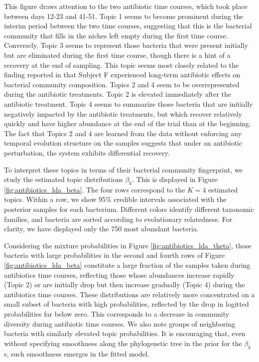 \documentclass{article}
\begin{document}
This figure draws attention to the two antibiotic time courses, which took place
between days 12-23 and 41-51. Topic 1 seems to become prominent during the
interim period between the two time courses, suggesting that this is the
bacterial community that fills in the niches left empty during the first time
course. Conversely, Topic 3 seems to represent those bacteria that were present
initially but are eliminated during the first time course, though there is a
hint of a recovery at the end of sampling. This topic seems most closely related
to the finding reported in \cite{dethlefsen2011incomplete} that Subject F
experienced long-term antibiotic effects on bacterial community composition.
Topics 2 and 4 seem to be overrepresented during the antibiotic treatments.
Topic 2 is elevated immediately after the antibiotic treatment. Topic 4 seems to
summarize those bacteria that are initially negatively impacted by the
antibiotic treatments, but which recover relatively quickly and have higher
abundance at the end of the trial than at the beginning. The fact that Topics 2
and 4 are learned from the data without enforcing any temporal evolution
structure on the samples suggests that under an antibiotic perturbation, the
system exhibits differential recovery.

To interpret these topics in terms of their bacterial community fingerprint, we
study the estimated topic distributions $\beta_{k}$. This is displayed in Figure
\ref{fig:antibiotics_lda_beta}. The four rows correspond to the $K = 4$
estimated topics. Within a row, we show 95\% credible intervals associated with
the posterior samples for each bacterium. Different colors identify different
taxonomic families, and bacteria are sorted according to evolutionary
relatedness. For clarity, we have displayed only the 750 most abundant bacteria.

Considering the mixture probabilities in Figure \ref{fig:antibiotics_lda_theta},
those bacteria with large probabilities in the second and fourth rows of Figure
\ref{fig:antibiotics_lda_beta} constitute a large fraction of the samples taken
during antibiotics time courses, reflecting those whose abundances increase
rapidly (Topic 2) or are initially drop but then increase gradually (Topic 4)
during the antibiotics time courses. These distributions are relatively more
concentrated on a small subset of bacteria with high probabilities, reflected by
the drop in logitted probabilities far below zero. This corresponds to a
decrease in community diversity during antibiotic time courses. We also note
groups of neighboring bacteria with similarly elevated topic probabilities. It
is encouraging that, even without specifying smoothness along the phylogenetic
tree in the prior for the $\beta_{k}$s, such smoothness emerges in the fitted
model.
\end{document}
